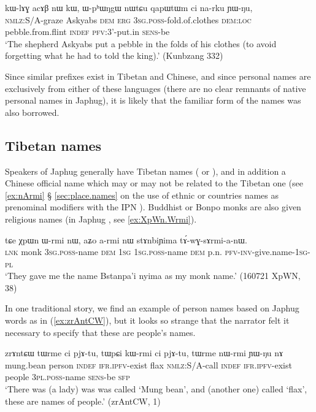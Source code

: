  \begin{exe}
\ex \label{ex:kWlAGacAB.nW.kW}
\gll kɯ-lɤɣ acɤβ nɯ kɯ, ɯ-pʰɯŋgɯ nɯtɕu qapɯtɯm ci na-rku ɲɯ-ŋu, \\
\textsc{nmlz}:S/A-graze Askyabs \textsc{dem} \textsc{erg} \textsc{3sg}.\textsc{poss}-fold.of.clothes \textsc{dem:loc} pebble.from.flint \textsc{indef} \textsc{pfv}:3'-put.in \textsc{sens}-be \\
\glt `The shepherd Askyabs put a pebble in the folds of his clothes (to avoid forgetting what he had to told the king).'  (Kunbzang 332)
\end{exe}

Since similar  prefixes exist in Tibetan and Chinese, and since personal names are exclusively from either of these languages (there are no clear remnants of native personal names in Japhug), it is likely that the familiar form of the names was also borrowed.

\subsection{Tibetan names} \label{sec:names.tibet}
Speakers of Japhug generally have Tibetan names ( or ), and in addition a Chinese official name which may or may not be related to the Tibetan one (see \ref{ex:nArmi} § \ref{sec:place.names} on the use of ethnic or countries names as prenominal modifiers with the IPN ). Buddhist or Bonpo monks are also given religious names (in Japhug , see \ref{ex:XpWn.Wrmi}). 
 
\begin{exe}
\ex \label{ex:XpWn.Wrmi}
\gll tɕe χpɯn ɯ-rmi nɯ, aʑo a-rmi nɯ stɤnbiɲima tɤ́-wɣ-sɤrmi-a-nɯ. \\
\textsc{lnk} monk \textsc{3sg}.\textsc{poss}-name \textsc{dem} \textsc{1sg} \textsc{1sg}.\textsc{poss}-name \textsc{dem} p.n. \textsc{pfv}-\textsc{inv}-give.name-\textsc{1sg}-\textsc{pl} \\
\glt `They gave me the name Bstanpa'i nyima as my monk name.' (160721 XpWN, 38)
\end{exe}

In one traditional story, we find an example of person names based on Japhug words as in (\ref{ex:zrAntCW}), but it looks so strange that the narrator felt it necessary to specify that these are people's names.

\begin{exe}
\ex  \label{ex:zrAntCW}
 \gll zrɤntɕɯ tɯrme ci pjɤ-tu, tɯpɕi kɯ-rmi ci pjɤ-tu, tɯrme nɯ-rmi ɲɯ-ŋu nɤ \\
mung.bean person \textsc{indef} \textsc{ifr}.\textsc{ipfv}-exist flax \textsc{nmlz}:S/A-call  \textsc{indef} \textsc{ifr}.\textsc{ipfv}-exist people  \textsc{3pl}.\textsc{poss}-name \textsc{sens}-be \textsc{sfp} \\
\glt `There was (a lady) was was called `Mung bean', and (another one) called `flax', these are names of people.' (zrAntCW, 1)
\end{exe}

